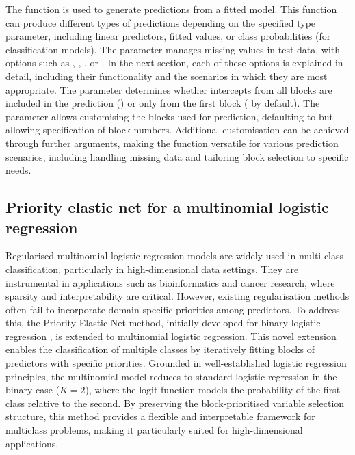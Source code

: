 The  function is used to generate predictions from a fitted model. This function can produce different types of predictions depending on the specified type parameter, including linear predictors, fitted values, or class probabilities (for classification models). The  parameter manages missing values in test data, with options such as , , , or . In the next section, each of these options is explained in detail, including their functionality and the scenarios in which they are most appropriate. The  parameter determines whether intercepts from all blocks are included in the prediction () or only from the first block ( by default). The  parameter allows customising the blocks used for prediction, defaulting to  but allowing specification of block numbers. Additional customisation can be achieved through further arguments, making the function versatile for various prediction scenarios, including handling missing data and tailoring block selection to specific needs.

\subsection{Priority elastic net for a multinomial logistic regression}\label{sub:multinomial}

Regularised multinomial logistic regression models are widely used in multi-class classification, particularly in high-dimensional data settings. They are instrumental in applications such as bioinformatics and cancer research, where sparsity and interpretability are critical. However, existing regularisation methods often fail to incorporate domain-specific priorities among predictors. To address this, the Priority Elastic Net method, initially developed for binary logistic regression \citep{musib2024priority}, is extended to multinomial logistic regression. 
This novel extension enables the classification of multiple classes by iteratively fitting blocks of predictors with specific priorities. Grounded in well-established logistic regression principles, the multinomial model reduces to standard logistic regression in the binary case ($K=2$), where the logit function models the probability of the first class relative to the second. By preserving the block-prioritised variable selection structure, this method provides a flexible and interpretable framework for multiclass problems, making it particularly suited for high-dimensional applications.


